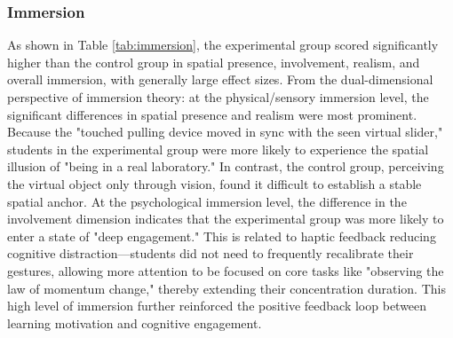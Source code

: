 \documentclass[runningheads]{llncs}
\begin{document}
\subsubsection{Immersion}
As shown in Table \ref{tab:immersion}, the experimental group scored significantly higher than the control group in spatial presence, involvement, realism, and overall immersion, with generally large effect sizes. From the dual-dimensional perspective of immersion theory: at the physical/sensory immersion level, the significant differences in spatial presence and realism were most prominent. Because the "touched pulling device moved in sync with the seen virtual slider," students in the experimental group were more likely to experience the spatial illusion of "being in a real laboratory." In contrast, the control group, perceiving the virtual object only through vision, found it difficult to establish a stable spatial anchor. At the psychological immersion level, the difference in the involvement dimension indicates that the experimental group was more likely to enter a state of "deep engagement." This is related to haptic feedback reducing cognitive distraction—students did not need to frequently recalibrate their gestures, allowing more attention to be focused on core tasks like "observing the law of momentum change," thereby extending their concentration duration. This high level of immersion further reinforced the positive feedback loop between learning motivation and cognitive engagement.
\end{document}
